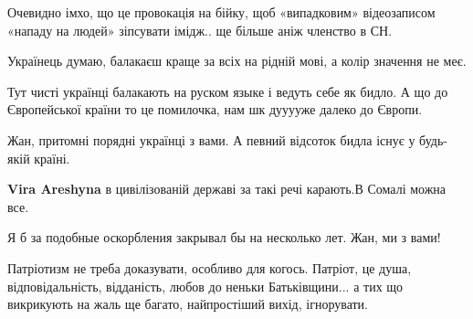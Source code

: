 \begin{itemize}
Очевидно імхо, що це провокація на бійку, щоб «випадковим» відеозаписом «нападу
на людей» зіпсувати імідж.. ще більше аніж членство в СН.


 

Українець думаю, балакаєш краще за всіх на рідній мові, а колір значення не меє.

Тут чисті українці балакають на руском языке і ведуть себе як бидло. А що до
Європейської країни то це помилочка, нам шк дууууже далеко до Європи.


 

Жан, притомні порядні українці з вами. А певний відсоток бидла існує у
будь-якій країні.

\begin{itemize}
 
\textbf{Vira Areshyna} в цивілізованій державі за такі речі карають.В Сомалі можна все.
\end{itemize}

 

Я б за подобные оскорбления закрывал бы на несколько лет. Жан, ми з вами!


 

Патріотизм не треба доказувати, особливо для когось. Патріот, це душа,
відповідальність, відданість, любов до неньки Батьківщини... а тих що
викрикують на жаль ще багато, найпростіший вихід, ігнорувати.



\end{itemize}
